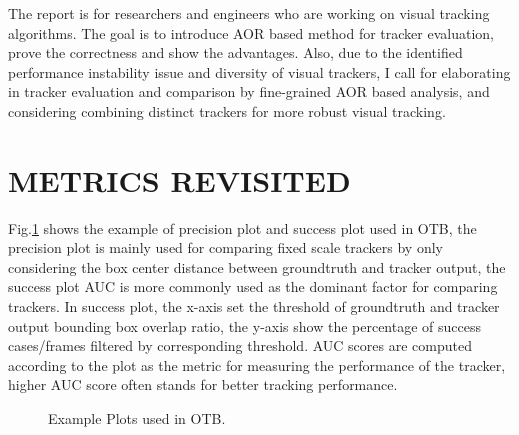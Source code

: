 \documentclass{article}
\begin{document}
The report is for researchers and engineers who are working on visual tracking algorithms. The goal is to introduce AOR based method for tracker evaluation, prove the correctness and show the advantages. Also, due to the identified performance instability issue and diversity of visual trackers, I call for elaborating in tracker evaluation and comparison by fine-grained AOR based analysis, and considering combining distinct trackers for more robust visual tracking.

\section{METRICS REVISITED}

Fig.\ref{fig:plots} shows the example of precision plot and success plot used in OTB\cite{otb}, the precision plot is mainly used for comparing fixed scale trackers by only considering the box center distance between groundtruth and tracker output, the success plot AUC is more commonly used as the dominant factor for comparing trackers. In success plot, the x-axis set the threshold of groundtruth and tracker output bounding box overlap ratio, the y-axis show the percentage of success cases/frames filtered by corresponding threshold. AUC scores are computed according to the plot as the metric for measuring the performance of the tracker, higher AUC score often stands for better tracking performance. 

\begin{figure}[htbp]%
    \centering
    \qquad
    \caption{Example Plots used in OTB\cite{otb}.}%
    \label{fig:plots}%
\end{figure}
\end{document}
